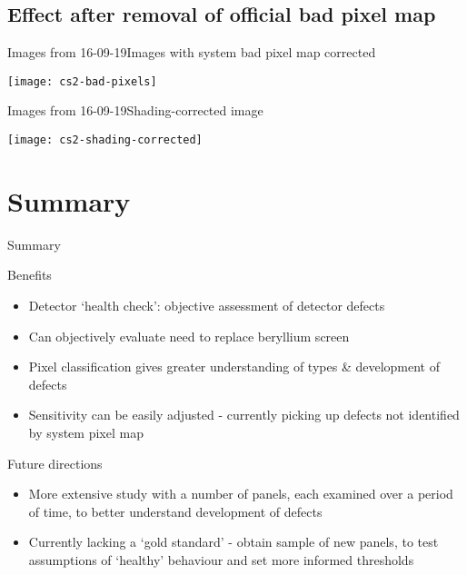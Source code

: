 \documentclass[8pt]{beamer}
\begin{document}

\subsection{Effect after removal of official bad pixel map}

\begin{frame}{Images from 16-09-19}{Images with system bad pixel map corrected}

	\begin{center}
		\texttt{[image: cs2-bad-pixels]}
	\end{center}
\end{frame}


\begin{frame}{Images from 16-09-19}{Shading-corrected image}

	\begin{center}
		\texttt{[image: cs2-shading-corrected]}
	\end{center}
	
\end{frame}


\section{Summary}
\begin{frame}{Summary}

Benefits
\begin{itemize}	
	\item Detector `health check': objective assessment of detector defects
	\item Can objectively evaluate need to replace beryllium screen
	\item Pixel classification gives greater understanding of types \& development of defects
	\item Sensitivity can be easily adjusted - currently picking up defects not identified by system pixel map
\end{itemize}

\vspace{12pt}
Future directions
\begin{itemize}
	\item More extensive study with a number of panels, each examined over a period of time, to better understand development of defects
	\item Currently lacking a `gold standard' - obtain sample of new panels, to test assumptions of `healthy' behaviour and set more informed thresholds
\end{itemize}

\end{frame}
\end{document}

